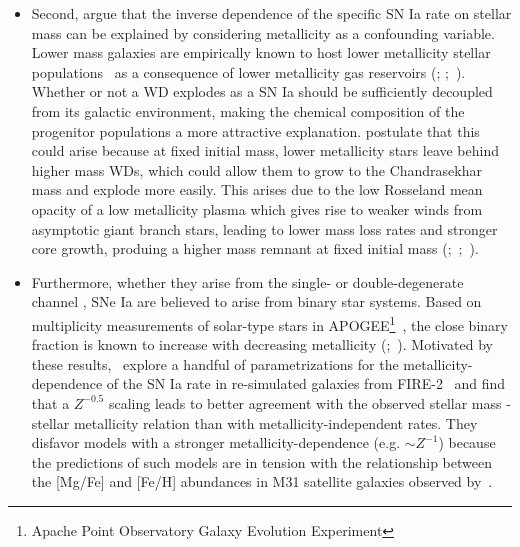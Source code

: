 \documentclass[ms.tex]{subfiles}
\begin{document}
\begin{itemize}
	\item Second, \citet{Kistler2013} argue that the inverse dependence of the
	specific SN Ia rate on stellar mass can be explained by considering
	metallicity as a confounding variable.
	Lower mass galaxies are empirically known to host lower metallicity stellar
	populations~\citep{Gallazzi2005, Kirby2013} as a consequence of lower
	metallicity gas reservoirs (\citealp{Tremonti2004, Andrews2013};
	\citealp*{Zahid2011};~\citealp{Zahid2014}).
	Whether or not a WD explodes as a SN Ia should be sufficiently decoupled
	from its galactic environment, making the chemical composition of the
	progenitor populations a more attractive explanation.
	\citet{Kistler2013} postulate that this could arise because at fixed
	initial mass, lower metallicity stars leave behind higher mass WDs, which
	could allow them to grow to the Chandrasekhar mass and explode more easily.
	This arises due to the low Rosseland mean opacity of a low metallicity
	plasma which gives rise to weaker winds from asymptotic giant branch stars,
	leading to lower mass loss rates and stronger core growth, produing a
	higher mass remnant at fixed initial mass (\citealp{Umeda1999, Willson2000,
	Marigo2007};~\citealp*{Meng2008};~\citealp{Zhao2012, Kalirai2014}).

	\item Furthermore, whether they arise from the single-
	\citep[e.g.][]{Whelan1973} or double-degenerate channel
	\citep[e.g.][]{Iben1984, Webbink1984}, SNe Ia are believed to arise from
	binary star systems.
	Based on multiplicity measurements of solar-type stars in APOGEE\footnote{
		Apache Point Observatory Galaxy Evolution Experiment
	}~\citep{Majewski2017}, the close binary fraction is known to increase
	with decreasing metallicity (\citealp{Badenes2018};~\citealp*{Moe2019}).
	Motivated by these results,~\citet{Gandhi2022} explore a handful of
	parametrizations for the metallicity-dependence of the SN Ia rate in
	re-simulated galaxies from FIRE-2~\citep{Hopkins2018} and find that a
	$Z^{-0.5}$ scaling leads to better agreement with the observed stellar
	mass - stellar metallicity relation than with metallicity-independent
	rates.
	They disfavor models with a stronger metallicity-dependence (e.g.
	$\sim Z^{-1}$) because the predictions of such models are in tension
	with the relationship between the [Mg/Fe] and [Fe/H] abundances in M31
	satellite galaxies observed by~\citet*{Vargas2014}.


\end{itemize}
\end{document}
